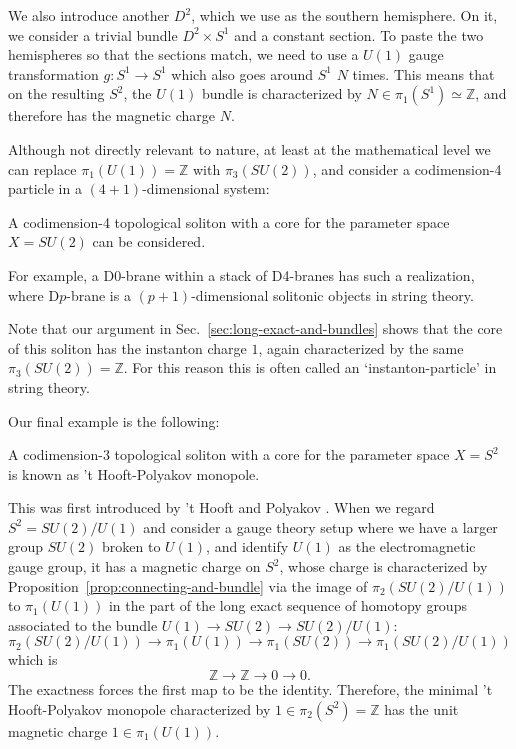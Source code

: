 \documentclass[12pt]{article}
\numberwithin{equation}{section}
\def\bZ{\mathbb{Z}}
\begin{document}
We also introduce another $D^2$, which we use as the southern hemisphere.
On it, we consider a trivial bundle $D^2\times S^1$ and a constant section.
To paste the two hemispheres so that the sections match, 
we need to use a $U(1)$ gauge transformation $g:S^1\to S^1$ which also goes around $S^1$ $N$ times.
This means that on the resulting $S^2$, the $U(1)$ bundle
is characterized by $N\in \pi_1(S^1)\simeq \bZ$,
and therefore has the magnetic charge $N$.


Although not directly relevant to nature,
at least at the mathematical level we can replace $\pi_1(U(1))=\bZ$ with $\pi_3(SU(2))$,
and consider a codimension-4 particle in a $(4+1)$-dimensional system:
\begin{example}
A codimension-4 topological soliton with a core for the parameter space $X=SU(2)$
can be considered.
\end{example}
For example, a D0-brane within a stack of D4-branes has such a realization,
where D$p$-brane is a $(p+1)$-dimensional solitonic objects in string theory.

Note that our argument in Sec.~\ref{sec:long-exact-and-bundles} 
shows that the core of this soliton has the instanton charge $1$, 
again characterized by the same $\pi_3(SU(2))=\bZ$.
For this reason this is often called an `instanton-particle' in string theory.


Our final example is the following:
\begin{example}
A codimension-3 topological soliton with a core for the parameter space $X=S^2$
is known as 't Hooft-Polyakov monopole.
\end{example}
This was first introduced by 't Hooft \cite{tHooft:1974kcl} and Polyakov \cite{Polyakov:1974ek}.
When we regard $S^2=SU(2)/U(1)$
and consider a gauge theory setup where we have a larger group $SU(2)$ broken to $U(1)$,
and identify $U(1)$ as the electromagnetic gauge group,
it has a magnetic charge on $S^2$,
whose charge is characterized by Proposition~\ref{prop:connecting-and-bundle} 
via the image of $\pi_2(SU(2)/U(1))$ to $\pi_1(U(1))$ in the part of
 the long exact sequence of  homotopy groups associated to the bundle $U(1)\to SU(2)\to SU(2)/U(1)$: \begin{equation}
 \pi_2(SU(2)/U(1)) \to \pi_1(U(1)) \to \pi_1(SU(2))\to \pi_1(SU(2)/U(1))
\end{equation} which is \begin{equation}
 \bZ \to \bZ \to 0 \to 0.
\end{equation}
The exactness forces the first map to be the identity.
Therefore, the minimal 't Hooft-Polyakov monopole characterized by $1\in \pi_2(S^2)=\bZ$
has the unit magnetic charge $1\in \pi_1(U(1))$.
\end{document}
